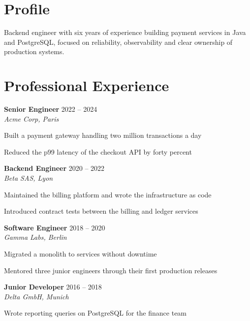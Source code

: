 \documentclass[10pt]{extarticle}
\newcommand{\role}[3]{%
  \textbf{#1} \hfill {\color{soft}\small #3}\\[-1pt]
  {\itshape\small #2}\par
}
\begin{document}
\begin{minipage}[t]{0.68\textwidth}
\section{Profile}

Backend engineer with six years of experience building payment services in Java and PostgreSQL, focused on reliability, observability and clear ownership of production systems.

\section{Professional Experience}

\role{Senior Engineer}{Acme Corp, Paris}{2022 – 2024}

\begin{tightlist}
    \item Built a payment gateway handling two million transactions a day

    \item Reduced the p99 latency of the checkout API by forty percent

\end{tightlist}

\role{Backend Engineer}{Beta SAS, Lyon}{2020 – 2022}

\begin{tightlist}
    \item Maintained the billing platform and wrote the infrastructure as code

    \item Introduced contract tests between the billing and ledger services

\end{tightlist}

\role{Software Engineer}{Gamma Labs, Berlin}{2018 – 2020}

\begin{tightlist}
    \item Migrated a monolith to services without downtime

    \item Mentored three junior engineers through their first production releases

\end{tightlist}

\role{Junior Developer}{Delta GmbH, Munich}{2016 – 2018}

\begin{tightlist}
    \item Wrote reporting queries on PostgreSQL for the finance team


\end{tightlist}
\end{minipage}
\end{document}
